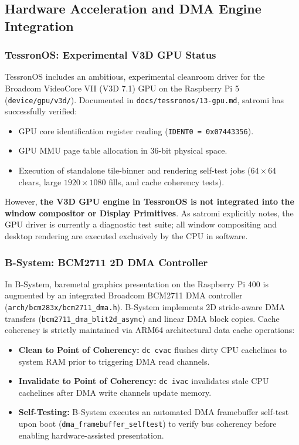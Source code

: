 \documentclass[10pt,journal,compsoc,twocolumn]{article}
\begin{document}
\subsection{Hardware Acceleration and DMA Engine Integration}

\subsubsection{TessronOS: Experimental V3D GPU Status}
TessronOS includes an ambitious, experimental cleanroom driver for the Broadcom VideoCore VII (V3D 7.1) GPU on the Raspberry Pi 5 (\texttt{device/gpu/v3d/}). Documented in \texttt{docs/tessronos/13-gpu.md}, satromi has successfully verified:
\begin{itemize}[leftmargin=*]
    \item GPU core identification register reading (\texttt{IDENT0 = 0x07443356}).
    \item GPU MMU page table allocation in 36-bit physical space.
    \item Execution of standalone tile-binner and rendering self-test jobs ($64 \times 64$ clears, large $1920 \times 1080$ fills, and cache coherency tests).
\end{itemize}
However, \textbf{the V3D GPU engine in TessronOS is not integrated into the window compositor or Display Primitives}. As satromi explicitly notes, the GPU driver is currently a diagnostic test suite; all window compositing and desktop rendering are executed exclusively by the CPU in software.

\subsubsection{B-System: BCM2711 2D DMA Controller}
In B-System, baremetal graphics presentation on the Raspberry Pi 400 is augmented by an integrated Broadcom BCM2711 DMA controller (\texttt{arch/bcm283x/bcm2711\_dma.h}). B-System implements 2D stride-aware DMA transfers (\texttt{bcm2711\_dma\_blit2d\_async}) and linear DMA block copies. Cache coherency is strictly maintained via ARM64 architectural data cache operations:
\begin{itemize}[leftmargin=*]
    \item \textbf{Clean to Point of Coherency:} \texttt{dc cvac} flushes dirty CPU cachelines to system RAM prior to triggering DMA read channels.
    \item \textbf{Invalidate to Point of Coherency:} \texttt{dc ivac} invalidates stale CPU cachelines after DMA write channels update memory.
    \item \textbf{Self-Testing:} B-System executes an automated DMA framebuffer self-test upon boot (\texttt{dma\_framebuffer\_selftest}) to verify bus coherency before enabling hardware-assisted presentation.
\end{itemize}
\end{document}
